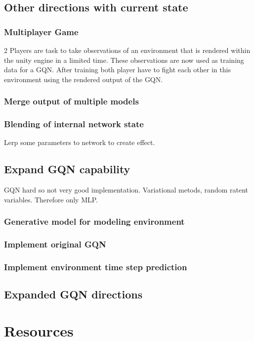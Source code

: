 \documentclass[a4paper, twoside, 10pt]{report}
\begin{document}
\section{Other directions with current state}
\subsection{Multiplayer Game}
2 Players are task to take observations of an environment that is rendered within the unity engine in a limited time. These observations  are now used as training data for a GQN. After training both player have to fight each other in this environment using the rendered output of the GQN.

\subsection{Merge output of multiple models}
\subsection{Blending of internal network state}
Lerp some parameters to network to create effect.

\section{Expand GQN capability}
GQN hard so not very good implementation. Variational metods, random ratent variables. Therefore only MLP.

\subsection{Generative model for modeling environment}
\subsection{Implement original GQN}
\subsection{Implement environment time step prediction}
\section{Expanded GQN directions}



\chapter{Resources}
\end{document}
